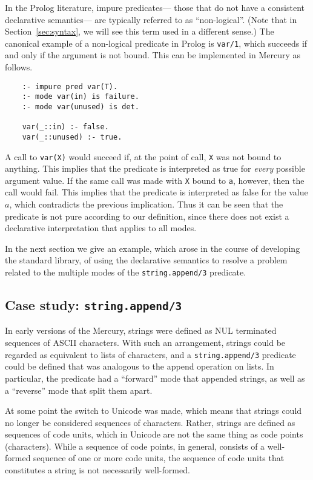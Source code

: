 In the Prolog literature, impure predicates---%
those that do not have a consistent declarative semantics---%
are typically referred to as ``non-logical\label{gi:non-logical}''.
(Note that in Section~\ref{sec:syntax},
we will see this term used in a different sense.)
The canonical example of a non-logical predicate in Prolog
is \texttt{var/1},
which succeeds if and only if the argument is not bound.
This can be implemented in Mercury as follows.
\begin{verbatim}
    :- impure pred var(T).
    :- mode var(in) is failure.
    :- mode var(unused) is det.

    var(_::in) :- false.
    var(_::unused) :- true.
\end{verbatim}
A call to \texttt{var(X)} would succeed if,
at the point of call,
\texttt{X} was not bound to anything.
This implies that the predicate is interpreted as true
for \emph{every} possible argument value.
If the same call was made with \texttt{X} bound to \texttt{a},
however, then the call would fail.
This implies that the predicate is interpreted as false
for the value $a$,
which contradicts the previous implication.
Thus it can be seen that the predicate is not pure
according to our definition,
since there does not exist a declarative interpretation
that applies to all modes.

In the next section we give an example,
which arose in the course of developing the standard library,
of using the declarative semantics to resolve a problem related to
the multiple modes of the \texttt{string.append/3} predicate.


\subsection{Case study: \texttt{string.append/3}}
\label{sec:purity-example}

In early versions of the Mercury,
strings were defined as NUL terminated sequences of ASCII characters.
With such an arrangement,
strings could be regarded as equivalent to lists of characters,
and a \texttt{string.append/3} predicate could be defined
that was analogous to the append operation on lists.
In particular,
the predicate had a ``forward'' mode that appended strings,
as well as a ``reverse'' mode that split them apart.

At some point the switch to Unicode was made,
which means that strings could no longer
be considered sequences of characters.
Rather, strings are defined as sequences of code units,
which in Unicode are not the same thing as code points (characters).
While a sequence of code points, in general,
consists of a well-formed sequence of one or more code units,
the sequence of code units that constitutes a string
is not necessarily well-formed.

